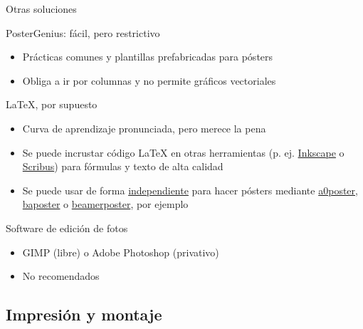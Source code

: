 \documentclass[xcolor=svgnames,compress]{beamer}
\begin{document}
\begin{frame}{Otras soluciones}

  \begin{block}{PosterGenius: fácil, pero restrictivo}
    \begin{itemize}
    \item Prácticas comunes y plantillas prefabricadas para pósters
    \item Obliga a ir por columnas y no permite gráficos vectoriales
    \end{itemize}
  \end{block}

  \begin{block}{\LaTeX, por supuesto \Smiley}
    \begin{itemize}
    \item Curva de aprendizaje pronunciada, pero merece la pena
    \item Se puede incrustar código \LaTeX{} en otras herramientas
      (p. ej. \href{http://blogs.ethz.ch/kowalski/2011/10/05/inkscape-and-latex/}{Inkscape}
      o
      \href{http://www.mostlymaths.net/2010/11/mathematics-poster-dropbox-scribus-and.html}{Scribus})
      para fórmulas y texto de alta calidad
    \item Se puede usar de forma
      \href{http://www.tex.ac.uk/cgi-bin/texfaq2html?label=poster}{independiente}
      para hacer pósters mediante
      \href{http://nxg.me.uk/docs/posters/}{a0poster}, \href{http://www.brian-amberg.de/uni/poster/}{baposter} o
      \href{http://www-i6.informatik.rwth-aachen.de/~dreuw/latexbeamerposter.php}{beamerposter},
      por ejemplo
    \end{itemize}
  \end{block}

  \begin{block}{Software de edición de fotos}
    \begin{itemize}
    \item GIMP (libre) o Adobe Photoshop (privativo)
    \item No recomendados
    \end{itemize}
  \end{block}
  
\end{frame}

\subsection{Impresión y montaje}
\end{document}

